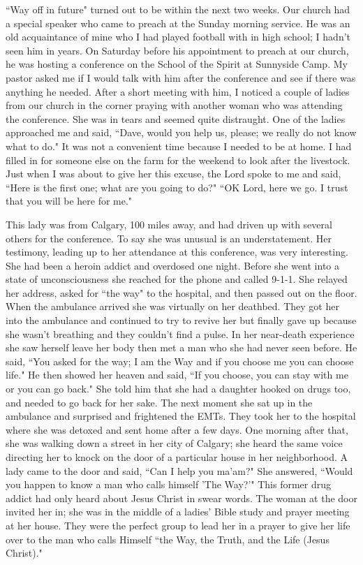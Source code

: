 \documentclass[oneside,12pt]{book}
\begin{document}
``Way off in future" turned out to be within the next two weeks. Our church had a special speaker who came to preach at the Sunday morning service. He was an old acquaintance of mine who I had played football with in high school; I hadn't seen him in years. On Saturday before his appointment to preach at our church, he was hosting a conference on the School of the Spirit at Sunnyside Camp. My pastor asked me if I would talk with him after the conference and see if there was anything he needed. After a short meeting with him, I noticed a couple of ladies from our church in the corner praying with another woman who was attending the conference. She  was in tears and seemed quite distraught. One of the ladies approached me and said, ``Dave, would you help us, please; we really do not know what to do." It was not a convenient time because I needed to be at home. I had filled in for someone else on the farm for the weekend to look after the livestock. Just when I was about to give her this excuse, the Lord spoke to me and said, ``Here is the first one; what are you going to do?" ``OK Lord, here we go. I trust that you will be here for me." 


This lady was from Calgary, 100 miles away, and had driven up with several others for the conference. To say she was unusual is an understatement. Her testimony, leading up to her attendance at this conference, was very interesting. She had been a heroin addict and overdosed one night. Before she went into a state of unconsciousness she reached for the phone and called 9-1-1. She relayed her address, asked for ``the way" to the hospital, and then passed out on the floor. When the ambulance arrived she was virtually on her deathbed. They got her into the ambulance and continued to try to revive her but finally gave up because she wasn't breathing and they couldn't find a pulse. In her near-death experience she saw herself leave her body then met a man who she had never seen before. He said, ``You asked for the way; I am the Way and if you choose me you can choose life."  He then showed her heaven and said, ``If you choose, you can stay with me or you can go back." She told him that she had a daughter hooked on drugs too, and needed to go back for her sake. The next moment she sat up in the ambulance and surprised and frightened the EMTs. They took her to the hospital where she was detoxed and sent home after a few days. One morning after that, she was walking down a street in her city of Calgary; she heard the same voice directing her to knock on the door of a particular house in her neighborhood. A lady came to the door and said, ``Can I help you ma'am?" She answered, ``Would you happen to know a man who calls himself 'The Way?'" This former drug addict had only heard about Jesus Christ in swear words. The woman at the door invited her in; she was in the middle of a ladies' Bible study and prayer meeting at her house. They were the perfect group to lead her in a prayer to give her life over to the man who calls Himself ``the Way, the Truth, and the Life (Jesus Christ)."
\end{document}
